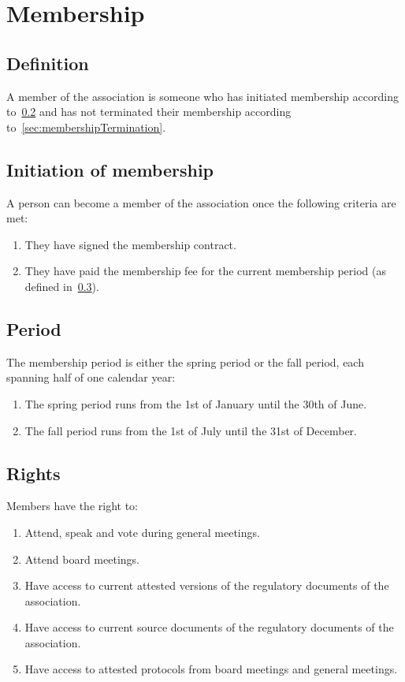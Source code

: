 \section*{Membership}
\subsection{Definition}
A member of the association is someone who has initiated membership according to~\ref{sec:membershipInitiation} 
and has not terminated their membership according to~\ref{sec:membershipTermination}.

\subsection{Initiation of membership}\label{sec:membershipInitiation}
A person can become a member of the association once the following criteria are met:
\begin{enumerate}
  \item They have signed the membership contract. %
  \item They have paid the membership fee for the current membership period (as defined in~\ref{sec:membershipPeriod}).
\end{enumerate}

\subsection{Period} \label{sec:membershipPeriod}
The membership period is either the spring period or the fall period, each spanning half of one calendar year:

\begin{enumerate}
  \item The spring period runs from the 1st of January until the 30th of June.
  \item The fall period runs from the 1st of July until the 31st of December.
\end{enumerate}

\subsection{Rights}
Members have the right to: 
\begin{enumerate}
  \item Attend, speak and vote during general meetings.
  \item Attend board meetings.
  \item Have access to current attested versions of the regulatory documents of the association.
  \item Have access to current source documents of the regulatory documents of the association.
  \item Have access to attested protocols from board meetings and general meetings.
\end{enumerate}

